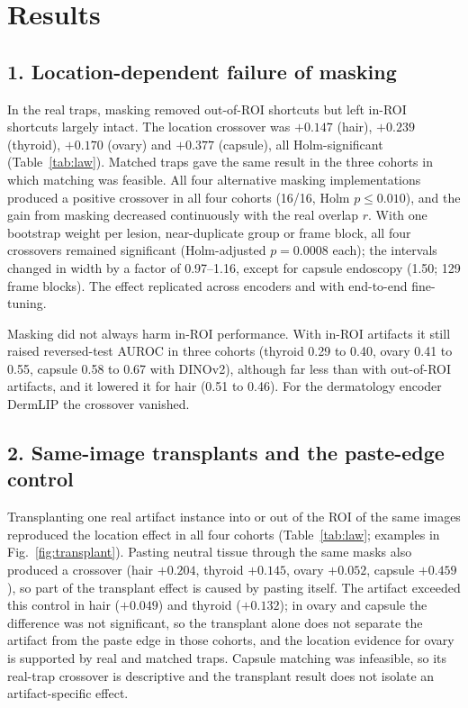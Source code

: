 \documentclass[12pt]{article}
\begin{document}
\section*{Results}
\subsection*{1. Location-dependent failure of masking}
In the real traps, masking removed out-of-ROI shortcuts but left in-ROI shortcuts largely intact. The location crossover
was $+0.147$ (hair), $+0.239$ (thyroid), $+0.170$ (ovary) and $+0.377$ (capsule), all Holm-significant
(Table~\ref{tab:law}). Matched traps gave the same result in the three cohorts in which matching was feasible. All four
alternative masking implementations produced a positive crossover in all four cohorts (16/16, Holm $p\le0.010$), and the
gain from masking decreased continuously with the real overlap $r$. With one bootstrap weight per lesion,
near-duplicate group or frame block, all four crossovers remained significant (Holm-adjusted $p=0.0008$ each); the
intervals changed in width by a factor of 0.97--1.16, except for capsule endoscopy (1.50; 129 frame blocks). The effect
replicated across encoders and with end-to-end fine-tuning.

Masking did not always harm in-ROI performance. With in-ROI artifacts it still raised reversed-test AUROC in three
cohorts (thyroid 0.29 to 0.40, ovary 0.41 to 0.55, capsule 0.58 to 0.67 with DINOv2), although far less than with
out-of-ROI artifacts, and it lowered it for hair (0.51 to 0.46). For the dermatology encoder DermLIP the crossover
vanished.

\subsection*{2. Same-image transplants and the paste-edge control}
Transplanting one real artifact instance into or out of the ROI of the same images reproduced the location effect in all
four cohorts (Table~\ref{tab:law}; examples in Fig.~\ref{fig:transplant}). Pasting neutral tissue through the same masks also produced a crossover (hair
$+0.204$, thyroid $+0.145$, ovary $+0.052$, capsule $+0.459$), so part of the transplant effect is caused by pasting
itself. The artifact exceeded this control in hair ($+0.049$) and thyroid ($+0.132$); in ovary and capsule the difference
was not significant, so the transplant alone does not separate the artifact from the paste edge in those cohorts, and the
location evidence for ovary is supported by real and matched traps. Capsule matching was infeasible, so its
real-trap crossover is descriptive and the transplant result does not isolate an artifact-specific effect.
\end{document}
